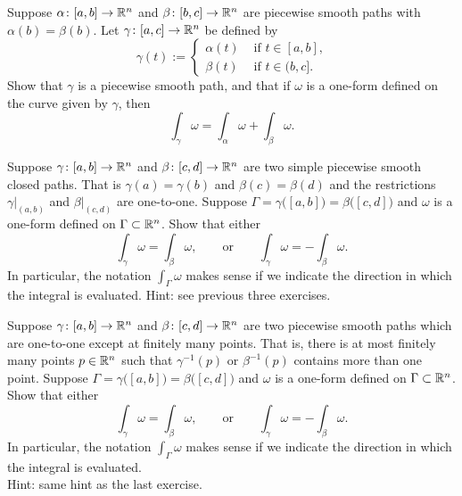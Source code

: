 \begin{exercise} 
Suppose $\alpha \colon [a,b] \to {\mathbb{R}}^n$ and
$\beta \colon [b,c] \to {\mathbb{R}}^n$ are piecewise smooth paths with
$\alpha(b)=\beta(b)$.  Let $\gamma \colon [a,c] \to {\mathbb{R}}^n$ be defined by
\begin{equation*}
\gamma(t) :=
\begin{cases}
\alpha(t) & \text{ if $t \in [a,b]$,} \\
\beta(t) & \text{ if $t \in (b,c]$.}
\end{cases}
\end{equation*}
Show that $\gamma$ is a piecewise smooth path, and that if $\omega$ is a
one-form defined on the curve given by $\gamma$, then
\begin{equation*}
\int_{\gamma} \omega =
\int_{\alpha} \omega +
\int_{\beta} \omega .
\end{equation*}
\end{exercise}

\begin{exercise} \label{mv:exercise:closedcurveintegral}
Suppose $\gamma \colon [a,b] \to {\mathbb{R}}^n$ and
$\beta \colon [c,d] \to {\mathbb{R}}^n$ are two simple piecewise smooth closed paths.
That is $\gamma(a)=\gamma(b)$ and $\beta(c) = \beta(d)$ and
the restrictions $\gamma|_{(a,b)}$ and $\beta|_{(c,d)}$ are one-to-one.
Suppose $\Gamma = \gamma\bigl([a,b]\bigr) = \beta\bigl([c,d]\bigr)$ and
$\omega$ is a one-form defined on $\Gamma \subset {\mathbb{R}}^n$.  Show that either
\begin{equation*}
\int_\gamma \omega = 
\int_\beta \omega,
\qquad \text{or} \qquad 
\int_\gamma \omega = 
- \int_\beta \omega.
\end{equation*}
In particular, the notation $\int_{\Gamma} \omega$ makes sense if we indicate
the direction in which the integral is evaluated.
Hint: see previous three exercises.
\end{exercise}

\begin{exercise} \label{mv:exercise:curveintegral}
Suppose $\gamma \colon [a,b] \to {\mathbb{R}}^n$ and
$\beta \colon [c,d] \to {\mathbb{R}}^n$ are two piecewise smooth paths
which are one-to-one except at finitely many points.  That is, there is at
most finitely many points $p \in {\mathbb{R}}^n$ such that
$\gamma^{-1}(p)$ or $\beta^{-1}(p)$ contains more than one point.
Suppose $\Gamma = \gamma\bigl([a,b]\bigr) = \beta\bigl([c,d]\bigr)$ and $\omega$ is a
one-form defined on $\Gamma \subset {\mathbb{R}}^n$.  Show that either
\begin{equation*}
\int_\gamma \omega = 
\int_\beta \omega,
\qquad \text{or} \qquad 
\int_\gamma \omega = 
- \int_\beta \omega.
\end{equation*}
In particular, the notation $\int_{\Gamma} \omega$ makes sense if we indicate
the direction in which the integral is evaluated.
\\
Hint: same hint as the last exercise.
\end{exercise}

